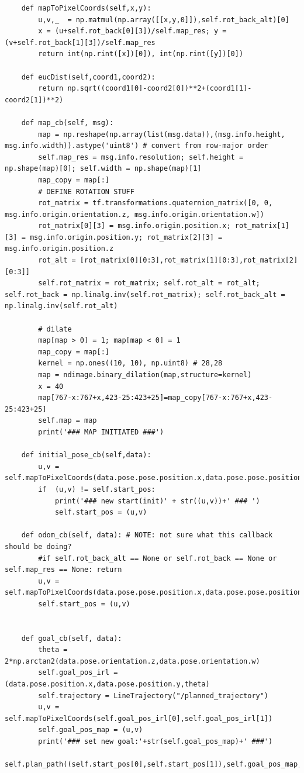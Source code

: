 \documentclass{article}
\begin{document}
{\begin{verbatim}
    def mapToPixelCoords(self,x,y):
        u,v,_  = np.matmul(np.array([[x,y,0]]),self.rot_back_alt)[0]
        x = (u+self.rot_back[0][3])/self.map_res; y = (v+self.rot_back[1][3])/self.map_res
        return int(np.rint([x])[0]), int(np.rint([y])[0])

    def eucDist(self,coord1,coord2): 
        return np.sqrt((coord1[0]-coord2[0])**2+(coord1[1]-coord2[1])**2)

    def map_cb(self, msg):
        map = np.reshape(np.array(list(msg.data)),(msg.info.height, msg.info.width)).astype('uint8') # convert from row-major order
        self.map_res = msg.info.resolution; self.height = np.shape(map)[0]; self.width = np.shape(map)[1]
        map_copy = map[:]
        # DEFINE ROTATION STUFF
        rot_matrix = tf.transformations.quaternion_matrix([0, 0, msg.info.origin.orientation.z, msg.info.origin.orientation.w])
        rot_matrix[0][3] = msg.info.origin.position.x; rot_matrix[1][3] = msg.info.origin.position.y; rot_matrix[2][3] = msg.info.origin.position.z
        rot_alt = [rot_matrix[0][0:3],rot_matrix[1][0:3],rot_matrix[2][0:3]]
        self.rot_matrix = rot_matrix; self.rot_alt = rot_alt; self.rot_back = np.linalg.inv(self.rot_matrix); self.rot_back_alt = np.linalg.inv(self.rot_alt)

        # dilate
        map[map > 0] = 1; map[map < 0] = 1
        map_copy = map[:]
        kernel = np.ones((10, 10), np.uint8) # 28,28
        map = ndimage.binary_dilation(map,structure=kernel)
        x = 40
        map[767-x:767+x,423-25:423+25]=map_copy[767-x:767+x,423-25:423+25]
        self.map = map
        print('### MAP INITIATED ###')

    def initial_pose_cb(self,data):
        u,v = self.mapToPixelCoords(data.pose.pose.position.x,data.pose.pose.position.y)
        if  (u,v) != self.start_pos:
            print('### new start(init)' + str((u,v))+' ### ')
            self.start_pos = (u,v)

    def odom_cb(self, data): # NOTE: not sure what this callback should be doing?
        #if self.rot_back_alt == None or self.rot_back == None or self.map_res == None: return
        u,v = self.mapToPixelCoords(data.pose.pose.position.x,data.pose.pose.position.y)
        self.start_pos = (u,v)


    def goal_cb(self, data):
        theta = 2*np.arctan2(data.pose.orientation.z,data.pose.orientation.w)
        self.goal_pos_irl = (data.pose.position.x,data.pose.position.y,theta)
        self.trajectory = LineTrajectory("/planned_trajectory")
        u,v = self.mapToPixelCoords(self.goal_pos_irl[0],self.goal_pos_irl[1])
        self.goal_pos_map = (u,v) 
        print('### set new goal:'+str(self.goal_pos_map)+' ###')
        self.plan_path((self.start_pos[0],self.start_pos[1]),self.goal_pos_map,self.map)



\end{verbatim}}
\end{document}
